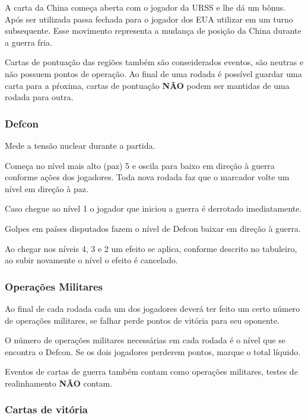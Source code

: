 \documentclass[11pt]{article}
\begin{document}
A carta da China começa aberta com o jogador da URSS e lhe dá um bônus. Após ser utilizada passa fechada para o jogador dos EUA utilizar em um turno subsequente. Esse movimento representa a mudança de posição
da China durante a guerra fria.

Cartas de pontuação das regiões também são conseiderados eventos, são neutras e não possuem pontos de operação. Ao final de uma rodada é possível guardar uma carta para a pŕoxima, cartas de pontuação \textbf{NÃO} podem
ser mantidas de uma rodada para outra.


\subsubsection{Defcon}
\label{sec:org4a4392e}

Mede a tensão nuclear durante a partida.

Começa no nível mais alto (paz) 5 e oscila para baixo em direção à guerra conforme ações dos jogadores. Toda nova rodada faz que o marcador volte um nível em direção à paz.

Caso chegue ao nível 1 o jogador que iniciou a guerra é derrotado imediatamente.

Golpes em países disputados fazem o nível de Defcon baixar em direção à guerra.

Ao chegar nos níveis 4, 3 e 2 um efeito se aplica, conforme descrito no tabuleiro, ao subir novamente o nível o efeito é cancelado.

\subsubsection{Operações Militares}
\label{sec:orgcae74a9}

Ao final de cada rodada cada um dos jogadores deverá ter feito um certo número de operações militares, se falhar perde pontos de vitória para seu oponente.

O número de operações militares necessárias em cada rodada é o nível que se encontra o Defcon. Se os dois jogadores perderem pontos, marque o total líquido.

Eventos de cartas de guerra também contam como operações militares, testes de realinhamento \textbf{NÃO} contam.

\subsubsection{Cartas de vitória}
\label{sec:org125cc38}
\end{document}
